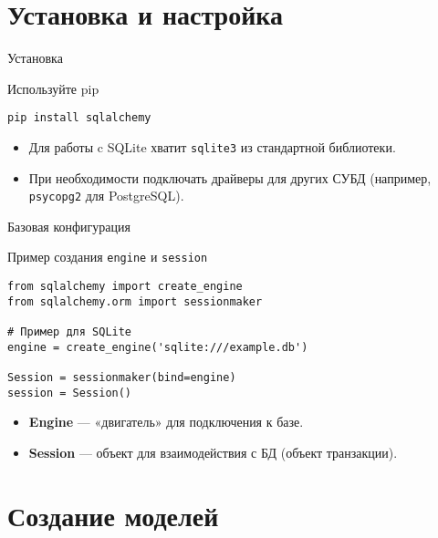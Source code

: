 \documentclass{beamer}
\begin{document}
\section{Установка и настройка}

\begin{frame}[fragile]{Установка}
	\begin{block}{Используйте pip}
		\begin{verbatim}
pip install sqlalchemy
\end{verbatim}
	\end{block}

	\begin{itemize}
		\item Для работы c SQLite хватит \texttt{sqlite3} из стандартной библиотеки.
		\item При необходимости подключать драйверы для других СУБД (например, \texttt{psycopg2} для PostgreSQL).
	\end{itemize}
\end{frame}

\begin{frame}[fragile]{Базовая конфигурация}
	\begin{block}{Пример создания \texttt{engine} и \texttt{session}}
		\begin{verbatim}
from sqlalchemy import create_engine
from sqlalchemy.orm import sessionmaker

# Пример для SQLite
engine = create_engine('sqlite:///example.db')

Session = sessionmaker(bind=engine)
session = Session()
\end{verbatim}
	\end{block}

	\begin{itemize}
		\item \textbf{Engine} — «двигатель» для подключения к базе.
		\item \textbf{Session} — объект для взаимодействия с БД (объект транзакции).
	\end{itemize}
\end{frame}

\section{Создание моделей}
\end{document}
